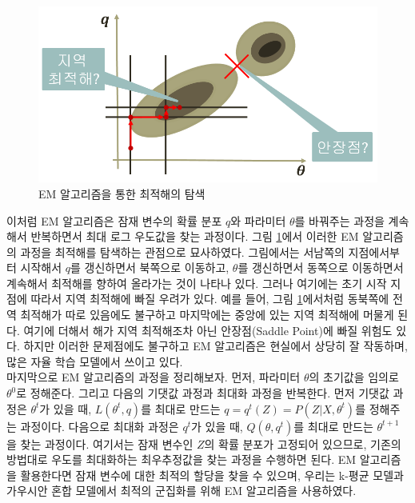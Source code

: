 \documentclass[a4paper]{oblivoir}
\begin{document}
\begin{figure}[ht] \centering 
\includegraphics[scale=0.8]{fig8_16.png} 
\caption{EM 알고리즘을 통한 최적해의 탐색}
\label{fig:8-16}
\end{figure}

이처럼 EM 알고리즘은 잠재 변수의 확률 분포 $q$와 파라미터 $\theta$를 바꿔주는 과정을 계속해서 반복하면서 최대 로그 우도값을 찾는 과정이다. 그림 \ref{fig:8-16}에서 이러한 EM 알고리즘의 과정을 최적해를 탐색하는 관점으로 묘사하였다. 그림에서는 서남쪽의 지점에서부터 시작해서 $q$를 갱신하면서 북쪽으로 이동하고, $\theta$를 갱신하면서 동쪽으로 이동하면서 계속해서 최적해를 향하여 올라가는 것이 나타나 있다. 그러나 여기에는 초기 시작 지점에 따라서 지역 최적해에 빠질 우려가 있다. 예를 들어, 그림 \ref{fig:8-16}에서처럼 동북쪽에 전역 최적해가 따로 있음에도 불구하고 마지막에는 중앙에 있는 지역 최적해에 머물게 된다. 여기에 더해서 해가 지역 최적해조차 아닌 안장점(Saddle Point)에 빠질 위험도 있다. 하지만 이러한 문제점에도 불구하고 EM 알고리즘은 현실에서 상당히 잘 작동하며, 많은 자율 학습 모델에서 쓰이고 있다. \\

마지막으로 EM 알고리즘의 과정을 정리해보자. 먼저, 파라미터 $\theta$의 초기값을 임의로 $\theta^0$로 정해준다. 그리고 다음의 기댓값 과정과 최대화 과정을 반복한다. 먼저 기댓값 과정은 $\theta^t$가 있을 때, $L(\theta^t, q)$를 최대로 만드는 $q = q^t(Z)=P(Z|X, \theta^t)$를 정해주는 과정이다. 다음으로 최대화 과정은 $q^t$가 있을 때, $Q(\theta, q^t)$를 최대로 만드는 $\theta^{t+1}$을 찾는 과정이다. 여기서는 잠재 변수인 $Z$의 확률 분포가 고정되어 있으므로, 기존의 방법대로 우도를 최대화하는 최우추정값을 찾는 과정을 수행하면 된다. EM 알고리즘을 활용한다면 잠재 변수에 대한 최적의 할당을 찾을 수 있으며, 우리는 k-평균 모델과 가우시안 혼합 모델에서 최적의 군집화를 위해 EM 알고리즘을 사용하였다.  
\end{document}
